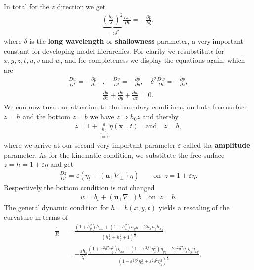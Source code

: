 In total for the $z$ direction we get
\begin{align}
   \underbrace{\left( \frac{h_0}{\lambda} \right)^2}_{=: \delta^2}
    \frac{Dw}{Dt} = -\frac{\partial p}{\partial \zeta},
\end{align}
where $\delta$ is the \textbf{long wavelength} or \textbf{shallowness}
parameter, a very important constant for developing model hierarchies. For
clarity we resubstitute for $x, y, z, t, u, v$ and $w$, and for completeness
we display the equations again, which are
\begin{align}\label{eq:nondim-motion}
    \frac{Du}{Dt} = - \frac{\partial p}{\partial x}&, \quad
    \frac{Dv}{Dt} = - \frac{\partial p}{\partial y}, \quad
    \delta^2\frac{Dw}{Dt} = - \frac{\partial p}{\partial z}, \\
    &\frac{\partial u}{\partial x} + \frac{\partial v}{\partial y}
    +\frac{\partial w}{\partial z}  = 0.
\end{align}
We can now turn our attention to the boundary conditions, on both free
surface $z=h$ and the bottom $z=b$ we have $z \Rightarrow h_0 z$ and thereby
\begin{align}
    z = 1+
    \underbrace{\frac{a}{h_0}}_{:=\varepsilon}\eta(\mathbf{x}_\perp,t) \quad
    \text{and}\quad z= b,
\end{align}
where we arrive at our second very important parameter $\varepsilon$ called
the \textbf{amplitude} parameter. As for the kinematic condition, we
substitute the free surface $z=h = 1+\varepsilon \eta$ and get
\begin{align}
    \frac{Dz}{Dt} = \varepsilon\left(\eta_t + (\mathbf{u}_\perp
        \nabla_\perp)\eta\right) \qquad \text{on}\;\; z= 1+\varepsilon \eta.
\end{align}
Respectively the bottom condition is not changed
\begin{align}
    w = b_t + (\mathbf{u}_\perp \nabla_\perp) b \quad \text{on}\;\; z= b.
\end{align}
The general dynamic condition for $h = h(x, y, t)$ yields a rescaling of the
curvature in terms of
\begin{align}
   \frac{1}{R}
   &= \frac{(1+h_y^2)h_{x x} + (1+h_x^2)h_yy - 2h_xh_yh_{xy}
   }{\left(h_x^2+h_y^2 +1  \right)^{\frac{3}{2}} } \\
   &= -\frac{\varepsilon h_0}{\lambda^2} \frac{(
   1+\varepsilon^2\delta^2\eta_y^2 )\eta_{x x}+
    (1+\varepsilon^2\delta^2\eta_x^2)\eta_{yy} -
    2\varepsilon^2\delta^2\eta_x\eta_y\eta_{xy}}{\left(
    1+\varepsilon^2\delta^2\eta_x^2+\varepsilon^2\delta^2\eta_y^2
    \right)^{\frac{3}{2}} },
\end{align}

